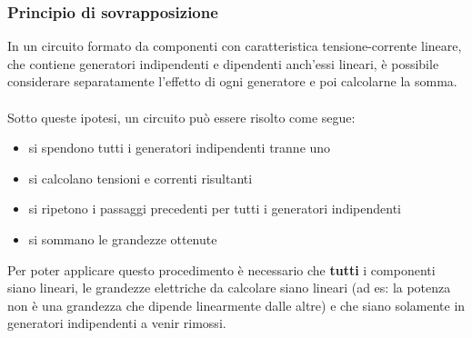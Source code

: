 \documentclass{article}
\begin{document}
\subsubsection{Principio di sovrapposizione}
In un circuito formato da componenti con caratteristica tensione-corrente lineare, che contiene generatori indipendenti e dipendenti anch'essi lineari, è possibile considerare separatamente l'effetto di ogni generatore e poi calcolarne la somma.\\\\
Sotto queste ipotesi, un circuito può essere risolto come segue:
\begin{itemize}
    \item si spendono tutti i generatori indipendenti tranne uno
    \item si calcolano tensioni e correnti risultanti
    \item si ripetono i passaggi precedenti per tutti i generatori indipendenti
    \item si sommano le grandezze ottenute
\end{itemize}
Per poter applicare questo procedimento è necessario che \textbf{tutti} i componenti siano lineari, le grandezze elettriche da calcolare siano lineari (ad es: la potenza non è una grandezza che dipende linearmente dalle altre) e che siano solamente in generatori indipendenti a venir rimossi.






\newpage
\Index
\end{document}
